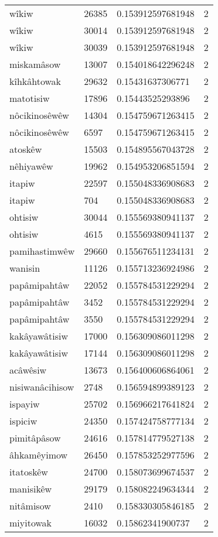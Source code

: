 \begin{longtable}{llll}
wîkiw & 26385 & 0.153912597681948 & 2 \\
wîkiw & 30014 & 0.153912597681948 & 2 \\
wîkiw & 30039 & 0.153912597681948 & 2 \\
miskamâsow & 13007 & 0.154018642296248 & 2 \\
kîhkâhtowak & 29632 & 0.15431637306771 & 2 \\
matotisiw & 17896 & 0.15443525293896 & 2 \\
nôcikinosêwêw & 14304 & 0.154759671263415 & 2 \\
nôcikinosêwêw & 6597 & 0.154759671263415 & 2 \\
atoskêw & 15503 & 0.154895567043728 & 2 \\
nêhiyawêw & 19962 & 0.154953206851594 & 2 \\
itapiw & 22597 & 0.155048336908683 & 2 \\
itapiw & 704 & 0.155048336908683 & 2 \\
ohtisiw & 30044 & 0.155569380941137 & 2 \\
ohtisiw & 4615 & 0.155569380941137 & 2 \\
pamihastimwêw & 29660 & 0.155676511234131 & 2 \\
wanisin & 11126 & 0.155713236924986 & 2 \\
papâmipahtâw & 22052 & 0.155784531229294 & 2 \\
papâmipahtâw & 3452 & 0.155784531229294 & 2 \\
papâmipahtâw & 3550 & 0.155784531229294 & 2 \\
kakâyawâtisiw & 17000 & 0.156309086011298 & 2 \\
kakâyawâtisiw & 17144 & 0.156309086011298 & 2 \\
acâwêsiw & 13673 & 0.156400606864061 & 2 \\
nisiwanâcihisow & 2748 & 0.156594899389123 & 2 \\
ispayiw & 25702 & 0.156966217641824 & 2 \\
ispiciw & 24350 & 0.157424758777134 & 2 \\
pimitâpâsow & 24616 & 0.157814779527138 & 2 \\
âhkamêyimow & 26450 & 0.157853252977596 & 2 \\
itatoskêw & 24700 & 0.158073699674537 & 2 \\
manisikêw & 29179 & 0.158082249634344 & 2 \\
nitâmisow & 2410 & 0.158330305846185 & 2 \\
miyitowak & 16032 & 0.15862341900737 & 2 \\

\end{longtable}
